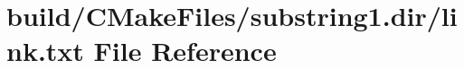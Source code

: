 \hypertarget{substring1_8dir_2link_8txt}{}\section{build/\+C\+Make\+Files/substring1.dir/link.txt File Reference}
\label{substring1_8dir_2link_8txt}
